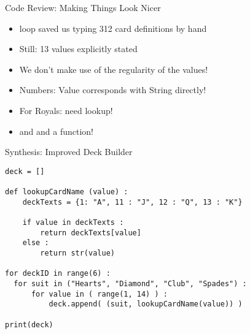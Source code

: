 
\begin{frame}[fragile]{Code Review: Making Things Look Nicer}
%
\begin{itemize}
\item {} loop saved us typing 312 card definitions by hand
\item Still: 13 values explicitly stated
\item We don't make use of the regularity of the values!
\item Numbers: Value corresponds with String directly!
\item For Royals: need lookup!
\item[\Thus]  and  and a function!
\end{itemize}
%
\end{frame}


\begin{frame}[fragile]{Synthesis: Improved Deck Builder}
%
\begin{codebox}
\begin{verbatim}
deck = []

def lookupCardName (value) :
    deckTexts = {1: "A", 11 : "J", 12 : "Q", 13 : "K"}
    
    if value in deckTexts :
        return deckTexts[value]
    else :
        return str(value)

for deckID in range(6) :
  for suit in ("Hearts", "Diamond", "Club", "Spades") :
      for value in ( range(1, 14) ) :
          deck.append( (suit, lookupCardName(value)) )

print(deck)
\end{verbatim}
\end{codebox}
%
\end{frame}


